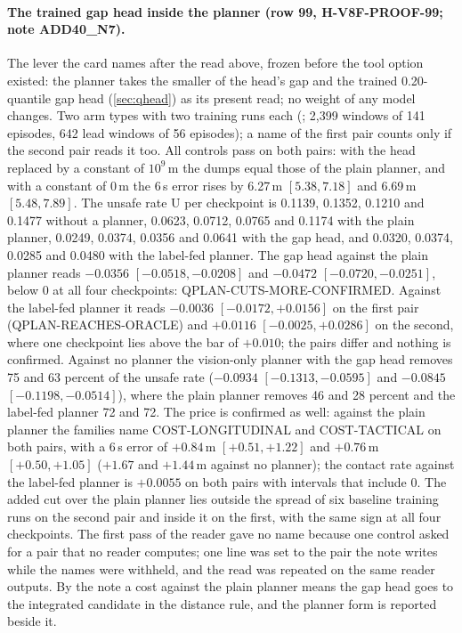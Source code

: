 \paragraph{The trained gap head inside the planner (row 99, H-V8F-PROOF-99; note ADD40\_N7).} The lever the card names after the read above, frozen before the tool option existed: the planner takes the smaller of the head's gap and the trained 0.20-quantile gap head (\cref{sec:qhead}) as its present read; no weight of any model changes. Two arm types with two training runs each (; 2,399 windows of 141 episodes, 642 lead windows of 56 episodes); a name of the first pair counts only if the second pair reads it too. All controls pass on both pairs: with the head replaced by a constant of $10^9$\,m the dumps equal those of the plain planner, and with a constant of 0\,m the 6\,s error rises by 6.27\,m $[5.38,7.18]$ and 6.69\,m $[5.48,7.89]$. The unsafe rate U per checkpoint is 0.1139, 0.1352, 0.1210 and 0.1477 without a planner, 0.0623, 0.0712, 0.0765 and 0.1174 with the plain planner, 0.0249, 0.0374, 0.0356 and 0.0641 with the gap head, and 0.0320, 0.0374, 0.0285 and 0.0480 with the label-fed planner. The gap head against the plain planner reads $-0.0356$ $[-0.0518,-0.0208]$ and $-0.0472$ $[-0.0720,-0.0251]$, below 0 at all four checkpoints: QPLAN-CUTS-MORE-CONFIRMED. Against the label-fed planner it reads $-0.0036$ $[-0.0172,+0.0156]$ on the first pair (QPLAN-REACHES-ORACLE) and $+0.0116$ $[-0.0025,+0.0286]$ on the second, where one checkpoint lies above the bar of $+0.010$; the pairs differ and nothing is confirmed. Against no planner the vision-only planner with the gap head removes 75 and 63 percent of the unsafe rate ($-0.0934$ $[-0.1313,-0.0595]$ and $-0.0845$ $[-0.1198,-0.0514]$), where the plain planner removes 46 and 28 percent and the label-fed planner 72 and 72. The price is confirmed as well: against the plain planner the families name COST-LONGITUDINAL and COST-TACTICAL on both pairs, with a 6\,s error of $+0.84$\,m $[+0.51,+1.22]$ and $+0.76$\,m $[+0.50,+1.05]$ ($+1.67$ and $+1.44$\,m against no planner); the contact rate against the label-fed planner is $+0.0055$ on both pairs with intervals that include 0. The added cut over the plain planner lies outside the spread of six baseline training runs on the second pair and inside it on the first, with the same sign at all four checkpoints. The first pass of the reader gave no name because one control asked for a pair that no reader computes; one line was set to the pair the note writes while the names were withheld, and the read was repeated on the same reader outputs. By the note a cost against the plain planner means the gap head goes to the integrated candidate in the distance rule, and the planner form is reported beside it.
